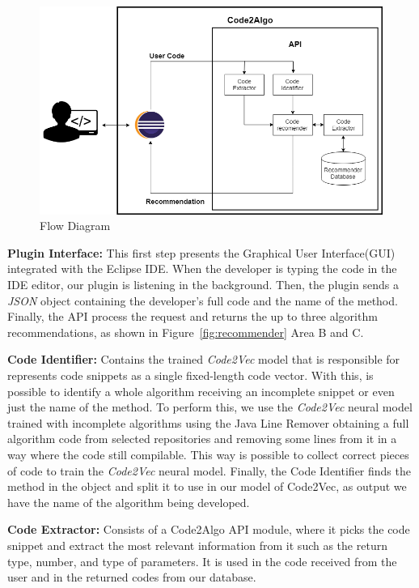 \documentclass[12pt]{article}
\begin{document}
    \begin{figure}[h]
        \centering
        \includegraphics[width=\linewidth]{cbsoft19/figs/Figure2.png}
        \caption{Flow Diagram}
        \label{fig:api}
    \end{figure}

    \textbf{Plugin Interface:} This first step presents the Graphical User Interface(GUI) integrated with the Eclipse IDE. When the developer is typing the code in the IDE editor, our plugin is listening in the background. Then,  the plugin sends a \textit{JSON} object containing the developer's full code and the name of the method. Finally, the API process the request and returns the up to three algorithm recommendations, as shown in Figure~\ref{fig:recommender} Area B and C.
    
    \textbf{Code Identifier:} Contains the trained \textit{Code2Vec} model \cite{Alon2018Code2vec} that is responsible for represents code snippets as a single fixed-length code vector.  With this, is possible to identify a whole algorithm receiving an incomplete snippet or even just the name of the method. To perform this, we use the \textit{Code2Vec} neural model trained with incomplete algorithms using the Java Line Remover obtaining a full algorithm code from selected repositories and removing some lines from it in a way where the code still compilable. This way is possible to collect correct pieces of code to train the \textit{Code2Vec} neural model. Finally, the Code Identifier finds the method in the object and split it to use in our model of Code2Vec, as output we have the name of the algorithm being developed. 
        
    \textbf{Code Extractor:} Consists of a Code2Algo API module, where it picks the code snippet and extract the most relevant information from it such as the return type, number, and type of parameters. It is used in the code received from the user and in the returned codes from our database. 
    
\end{document}
